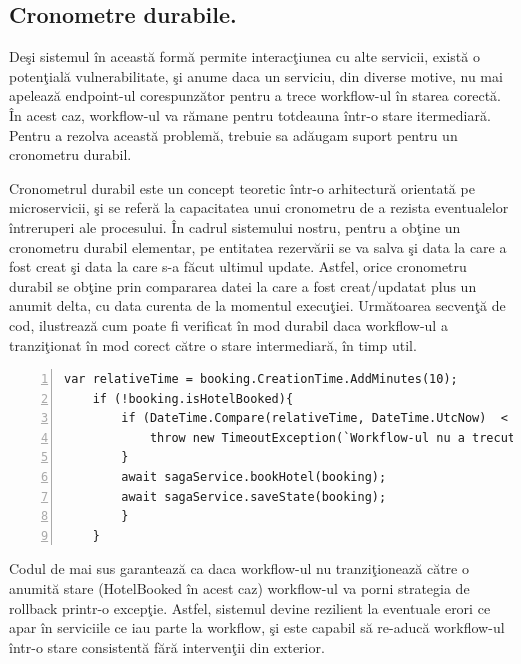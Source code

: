 \documentclass[a4paper,12pt]{report}
\begin{document}
\subsection{Cronometre durabile.}
\par Deşi sistemul în această formă permite interacţiunea cu alte servicii, există o potenţială vulnerabilitate, şi anume daca un serviciu, din diverse motive, nu mai apelează endpoint-ul corespunzător pentru a trece workflow-ul în starea corectă. În acest caz, workflow-ul va rămane pentru totdeauna într-o stare itermediară. Pentru a rezolva această problemă, trebuie sa adăugam suport pentru un cronometru durabil. 
\par Cronometrul durabil este un concept teoretic într-o arhitectură orientată pe microservicii, şi se referă la capacitatea unui cronometru de a rezista eventualelor întreruperi ale procesului. În cadrul sistemului nostru, pentru a obţine un cronometru durabil elementar, pe entitatea rezervării se va salva şi data la care a fost creat şi data la care s-a făcut ultimul update. Astfel, orice cronometru durabil se obţine prin compararea datei la care a fost creat/updatat plus un anumit delta, cu data curenta de la momentul execuţiei. Următoarea secvenţă de cod, ilustrează cum poate fi verificat în mod durabil daca workflow-ul a tranziţionat în mod corect către o stare intermediară, în timp util.
\begin{Verbatim}[numbers=left]
	var relativeTime = booking.CreationTime.AddMinutes(10);
	if (!booking.isHotelBooked){
		if (DateTime.Compare(relativeTime, DateTime.UtcNow)  < 0 ){
			throw new TimeoutException(`Workflow-ul nu a trecut la pasul următor destul de rapid`);
		}
		await sagaService.bookHotel(booking);
		await sagaService.saveState(booking);
		}
	}
\end{Verbatim}
\par Codul de mai sus garantează ca daca workflow-ul nu tranziţionează către o anumită stare (HotelBooked în acest caz) workflow-ul va porni strategia de rollback printr-o excepţie. Astfel, sistemul devine rezilient la eventuale erori ce apar în serviciile ce iau parte la workflow, şi este capabil să re-aducă workflow-ul într-o stare consistentă fără intervenţii din exterior. 
\end{document}
